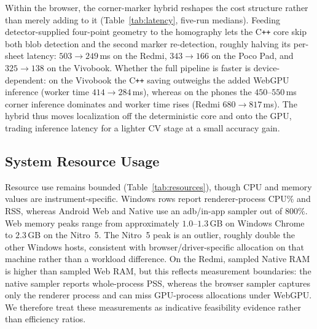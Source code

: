 \documentclass[conference]{IEEEtran}
\begin{document}
Within the browser, the corner-marker hybrid reshapes the cost structure
rather than merely adding to it (Table~\ref{tab:latency}, five-run medians).
Feeding detector-supplied four-point geometry
to the homography lets the C\texttt{++} core skip both blob detection and the second marker re-detection, roughly
halving its per-sheet latency: $503\to249$\,ms on the Redmi, $343\to166$ on
the Poco Pad, and $325\to138$ on the Vivobook. Whether the full pipeline is
faster is device-dependent: on the Vivobook the C\texttt{++} saving
outweighs the added WebGPU inference (worker time $414\to284$\,ms), whereas
on the phones the $450$--$550$\,ms corner inference dominates and worker time
rises (Redmi $680\to817$\,ms). The hybrid thus moves localization off the
deterministic core and onto the GPU, trading inference latency for a lighter
CV stage at a small accuracy gain.


\FloatBarrier
\subsection{System Resource Usage}
\label{sec:resources}

Resource use remains bounded (Table~\ref{tab:resources}), though CPU and
memory values are instrument-specific. Windows rows report renderer-process
CPU\% and RSS, whereas Android Web and Native use an adb/in-app sampler out of
$800\%$. Web memory peaks range from approximately $1.0$--$1.3$\,GB on Windows
Chrome to $2.3$\,GB on the Nitro~5. The Nitro~5 peak is an outlier, roughly
double the other Windows hosts, consistent with browser/driver-specific
allocation on that machine rather than a workload difference. On the Redmi, sampled Native RAM is higher
than sampled Web RAM, but this reflects measurement boundaries: the native
sampler reports whole-process PSS, whereas the browser sampler captures only
the renderer process and can miss GPU-process allocations under WebGPU. We
therefore treat these measurements as indicative feasibility evidence rather
than efficiency ratios.
\end{document}

